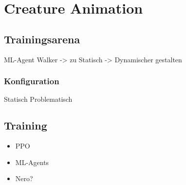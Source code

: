 \section{Creature Animation}

\subsection{Trainingsarena}
ML-Agent Walker -> zu Statisch -> Dynamischer gestalten
\subsubsection{Konfiguration}
Statisch Problematisch
\subsection{Training}
\begin{itemize}
	\item PPO
	\item ML-Agents
	\item Nero?
\end{itemize}
